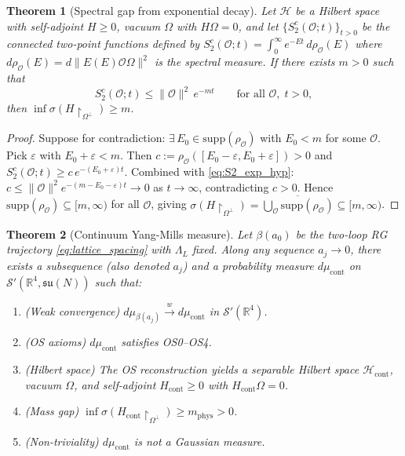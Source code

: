 \documentclass[11pt,a4paper]{amsart}
\newtheorem{theorem}{Theorem}[section]
\theoremstyle{definition}
\newcommand{\su}{\mathfrak{su}}
\newcommand{\R}{\mathbb{R}}
\newcommand{\supp}{\mathrm{supp}}
\begin{document}
\begin{theorem}[Spectral gap from exponential decay]
\label{thm:tauberian_gap}
Let $\mathcal{H}$ be a Hilbert space with self-adjoint $H \ge 0$,
vacuum $\Omega$ with $H\Omega = 0$, and let $\{S_2^c(\mathcal{O};t)\}_{t>0}$
be the connected two-point functions defined by
$S_2^c(\mathcal{O};t) = \int_0^\infty e^{-Et}\,d\rho_{\mathcal{O}}(E)$
where $d\rho_{\mathcal{O}}(E) = d\|E(E)\mathcal{O}\Omega\|^2$ is the spectral
measure.  If there exists $m > 0$ such that
\begin{equation}\label{eq:S2_exp_hyp}
  S_2^c(\mathcal{O};t) \le \|\mathcal{O}\|^2\,e^{-mt}
  \qquad\text{for all } \mathcal{O},\; t > 0,
\end{equation}
then $\inf\sigma(H\restriction_{\Omega^\perp}) \ge m$.
\end{theorem}

\begin{proof}
Suppose for contradiction: $\exists\,E_0 \in \supp(\rho_{\mathcal{O}})$ with
$E_0 < m$ for some $\mathcal{O}$.  Pick $\varepsilon$ with $E_0+\varepsilon < m$.
Then $c := \rho_{\mathcal{O}}([E_0-\varepsilon, E_0+\varepsilon]) > 0$ and
$S_2^c(\mathcal{O};t) \ge c\,e^{-(E_0+\varepsilon)t}$.
Combined with \eqref{eq:S2_exp_hyp}:
$c \le \|\mathcal{O}\|^2 e^{-(m-E_0-\varepsilon)t} \to 0$ as $t\to\infty$,
contradicting $c > 0$.
Hence $\supp(\rho_{\mathcal{O}}) \subseteq [m,\infty)$ for all $\mathcal{O}$,
giving $\sigma(H\restriction_{\Omega^\perp}) = \overline{\bigcup_{\mathcal{O}}
\supp(\rho_{\mathcal{O}})} \subseteq [m,\infty)$.
\end{proof}

\begin{theorem}[Continuum Yang-Mills measure]
\label{thm:continuum_limit}
Let $\beta(a_0)$ be the two-loop RG trajectory \eqref{eq:lattice_spacing} with
$\Lambda_L$ fixed.  Along any sequence $a_j\to 0$, there exists a subsequence
(also denoted $a_j$) and a probability measure $d\mu_{\mathrm{cont}}$ on
$\mathcal{S}'(\R^4, \su(N))$ such that:
\begin{enumerate}[label=(\roman*)]
\item \emph{(Weak convergence)} $d\mu_{\beta(a_j)} \xrightarrow{w} d\mu_{\mathrm{cont}}$
      in $\mathcal{S}'(\R^4)$.
\item \emph{(OS axioms)} $d\mu_{\mathrm{cont}}$ satisfies OS0--OS4.
\item \emph{(Hilbert space)} The OS reconstruction yields a separable Hilbert
      space $\mathcal{H}_{\mathrm{cont}}$, vacuum $\Omega$, and self-adjoint
      $H_{\mathrm{cont}} \ge 0$ with $H_{\mathrm{cont}}\Omega = 0$.
\item \emph{(Mass gap)} $\inf\sigma(H_{\mathrm{cont}}\restriction_{\Omega^\perp})
      \ge m_{\mathrm{phys}} > 0$.
\item \emph{(Non-triviality)} $d\mu_{\mathrm{cont}}$ is not a Gaussian measure.
\end{enumerate}
\end{theorem}
\end{document}
